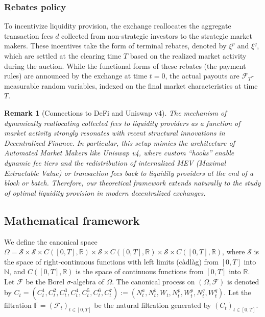 \documentclass[12pt]{article}
\newtheorem{remark}[theorem2]{Remark}
\begin{document}
\subsubsection{Rebates policy}

To incentivize liquidity provision, the exchange reallocates the aggregate transaction fees $d$ collected from non-strategic investors to the strategic market makers. These incentives take the form of terminal rebates, denoted by $\xi^p$ and $\xi^q$, which are settled at the clearing time $T$ based on the realized market activity during the auction. While the functional forms of these rebates (the payment rules) are announced by the exchange at time $t=0$, the actual payouts are $\mathcal{F}_T$-measurable random variables, indexed on the final market characteristics at time $T$.

\begin{remark}[Connections to DeFi and Uniswap v4]
The mechanism of dynamically reallocating collected fees to liquidity providers as a function of market activity strongly resonates with recent structural innovations in Decentralized Finance. In particular, this setup mimics the architecture of Automated Market Makers like Uniswap v4, where custom ``hooks'' enable dynamic fee tiers and the redistribution of internalized MEV (Maximal Extractable Value) or transaction fees back to liquidity providers at the end of a block or batch. Therefore, our theoretical framework extends naturally to the study of optimal liquidity provision in modern decentralized exchanges.
\end{remark}

\subsection{Mathematical framework}

We define the canonical space $\Omega = \mathcal{S} \times \mathcal{S} \times C([0,T],\mathbb{R}) \times \mathcal{S} \times C([0,T],\mathbb{R}) \times \mathcal{S} \times C([0,T],\mathbb{R})$, where $\mathcal{S}$ is the space of right-continuous functions with left limits (càdlàg) from $[0,T]$ into $\mathbb{N}$, and $C([0,T],\mathbb{R})$ is the space of continuous functions from $[0,T]$ into $\mathbb{R}$. Let $\mathcal{F}$ be the Borel $\sigma$-algebra of $\Omega$. The canonical process on $(\Omega,\mathcal{F})$ is denoted by 
$C_t = (C^1_t, C^2_t, C^3_t, C^4_t, C^5_t, C^6_t, C^7_t) := (N_t^a , N_t^b, W_t, N_t^{p}, W_t^p, N_t^{q}, W_t^q)$. 
Let the filtration $\mathbb{F} = (\mathcal{F}_t)_{t \in [0,T]}$ be the natural filtration generated by $(C_t)_{t \in [0,T]}$. 
\end{document}
